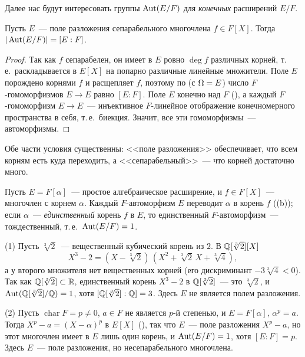 Далее нас будут интересовать группы $\operatorname{Aut}(E/F)$ для \emph{конечных} расширений $E/F$.

\begin{proposition}[3.2]
Пусть $E$~--- поле разложения сепарабельного многочлена $f\in F[X]$. Тогда $|\operatorname{Aut}(E/F)|=[E:F]$.
\end{proposition}

\begin{proof}
Так как $f$ сепарабелен, он имеет в $E$ ровно $\deg f$ различных корней, т.\,е.\ раскладывается в $E[X]$ на попарно
различные линейные множители. Поле $E$ порождено корнями $f$ и расщепляет $f$, поэтому по  (с $\Omega=E$) число
$F$-гомоморфизмов $E\to E$ равно $[E:F]$. Поле $E$ конечно над $F$ (), а каждый $F$-гомоморфизм $E\to E$~---
инъективное $F$-линейное отображение конечномерного пространства в себя, т.\,е.\ биекция. Значит, все эти гомоморфизмы~---
автоморфизмы.
\end{proof}

\begin{keepfig}
\begin{center}
\end{center}
\end{keepfig}

Обе части условия существенны: <<поле разложения>> обеспечивает, что всем корням есть куда переходить, а
<<сепарабельный>>~--- что корней достаточно много.

\begin{example}[3.3]
Пусть $E=F[\alpha]$~--- простое алгебраическое расширение, и $f\in F[X]$~--- многочлен с корнем $\alpha$. Каждый
$F$-автоморфизм $E$ переводит $\alpha$ в корень $f$ ((b)); если $\alpha$~--- \emph{единственный} корень $f$ в $E$,
то единственный $F$-автоморфизм~--- тождественный, т.\,е.\ $\operatorname{Aut}(E/F)=1$.

(1) Пусть $\sqrt[3]2$~--- вещественный кубический корень из $2$. В $\mathbb Q[\sqrt[3]2][X]$
\[
X^3-2=(X-\sqrt[3]2)\,(X^2+\sqrt[3]2\,X+\sqrt[3]4),
\]
а у второго множителя нет вещественных корней (его дискриминант $-3\sqrt[3]4<0$). Так как $\mathbb Q[\sqrt[3]2]\subset\mathbb R$, единственный
корень $X^3-2$ в $\mathbb Q[\sqrt[3]2]$~--- это $\sqrt[3]2$, и $\operatorname{Aut}(\mathbb Q[\sqrt[3]2]/\mathbb Q)=1$, хотя $[\mathbb Q[\sqrt[3]2]:\mathbb Q]=3$. Здесь $E$ не
является полем разложения.

(2) Пусть $\operatorname{char}F=p\ne0$, $a\in F$ не является $p$-й степенью, и $E=F[\alpha]$, $\alpha^p=a$. Тогда
$X^p-a=(X-\alpha)^p$ в $E[X]$ (), так что $E$~--- поле разложения $X^p-a$, но этот многочлен имеет в $E$ лишь один
корень, и $\operatorname{Aut}(E/F)=1$, хотя $[E:F]=p$. Здесь $E$~--- поле разложения, но несепарабельного многочлена.
\end{example}

